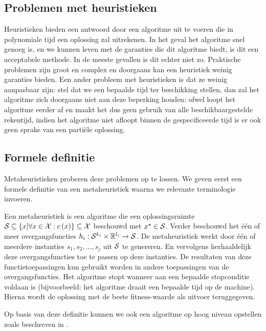 \subsection{Problemen met heuristieken}

Heuristieken bieden een antwoord door een algoritme uit te voeren die in polynomiale tijd een oplossing zal uitrekenen. In het geval het algoritme snel genoeg is, en we kunnen leven met de garanties die dit algoritme biedt, is dit een acceptabele methode. In de meeste gevallen is dit echter niet zo. Praktische problemen zijn groot en complex en doorgaans kan een heuristiek weinig garanties bieden. Een ander probleem met heuristieken is dat ze weinig aanpasbaar zijn: stel dat we een bepaalde tijd ter beschikking stellen, dan zal het algoritme zich doorgaans niet aan deze beperking houden: ofwel loopt het algoritme eerder af en maakt het dus geen gebruik van alle beschikbaargestelde rekentijd, indien het algoritme niet afloopt binnen de gespecificeerde tijd is er ook geen sprake van een parti\"ele oplossing.

\subsection{Formele definitie}

Metaheuristieken proberen deze problemen op te lossen. We geven eerst een formele definitie van een metaheuristiek waarna we relevante terminologie invoeren.

\begin{definition}[Metaheuristiek]
Een metaheuristiek is een algoritme die een oplossingsruimte $\mathcal{S}\subseteq\left\{ x|\forall x\in \mathcal{X}:c\left(x\right)\right\}\subseteq\mathcal{X}$ beschouwd met $x^{\star}\in\mathcal{S}$. Verder beschouwd het \'e\'en of meer overgangsfuncties $h_i:\mathcal{S}^{k_i}\times\mathbb{R}^{l_i}\rightarrow\mathcal{S}$. De metaheuristiek werkt door \'e\'en of meerdere instanties $s_1,s_2,\ldots,s_j$ uit $\mathcal{S}$ te genereren. En vervolgens herhaaldelijk deze overgangsfuncties toe te passen op deze instanties. De resultaten van deze functietoepassingen kun gebruikt worden in andere toepassingen van de overgangsfuncties. Het algoritme stopt wanneer aan een bepaalde stopconditie voldaan is (bijvoorbeeld: het algoritme draait een bepaalde tijd op de machine). Hierna wordt de oplossing met de beste fitness-waarde als uitvoer teruggegeven.
\end{definition}

Op basis van deze definitie kunnen we ook een algoritme op hoog niveau opstellen zoals beschreven in .


